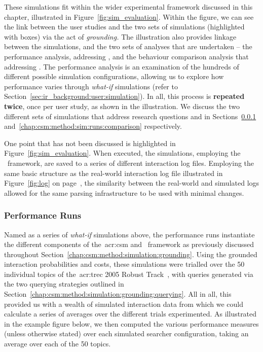 These simulations fit within the wider experimental framework discussed in this chapter, illustrated in Figure~\ref{fig:sim_evaluation}. Within the figure, we can see the link between the user studies and the two sets of simulations (highlighted with  boxes) via the act of \emph{grounding.} The illustration also provides linkage between the simulations, and the two sets of analyses that are undertaken -- the performance analysis, addressing , and the behaviour comparison analysis that addressing . The performance analysis is an examination of the hundreds of different possible simulation configurations, allowing us to explore how performance varies through \emph{what-if} simulations (refer to Section~\ref{sec:ir_background:user:simulation}). In all, this process is \textbf{\color{dmax_red} repeated twice}, once per user study, as shown in the illustration. We discuss the two different sets of simulations that address research questions  and  in Sections~\ref{chap:csm:method:sim:runs:performance} and~\ref{chap:csm:method:sim:runs:comparison} respectively.

One point that has not been discussed is highlighted in Figure~\ref{fig:sim_evaluation}. When executed, the simulations, employing the \simiir~framework, are saved to a series of different interaction log files. Employing the same basic structure as the real-world interaction log file illustrated in Figure~\ref{fig:log} on page~\pageref{fig:log}, the similarity between the real-world and simulated logs allowed for the same parsing infrastructure to be used with minimal changes.

\subsubsection{Performance Runs}\label{chap:csm:method:sim:runs:performance}
Named as a series of \emph{what-if} simulations above, the performance runs instantiate the different components of the~\gls{acr:csm} and \simiir~framework as previously discussed throughout Section~\ref{chap:csm:method:simulation:grounding}. Using the grounded interaction probabilities and costs, these simulations were trialled over the 50 individual topics of the~\gls{acr:trec} 2005 Robust Track~\cite{voorhees2006trec_robust}, with queries generated via the two querying strategies outlined in Section~\ref{chap:csm:method:simulation:grounding:querying}. All in all, this provided us with a wealth of simulated interaction data from which we could calculate a series of averages over the different trials experimented. As illustrated in the example figure below, we then computed the various performance measures (unless otherwise stated) over each simulated searcher configuration, taking an average over each of the 50 topics.

